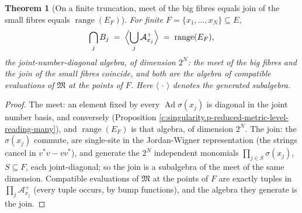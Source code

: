 \documentclass[11pt]{article}
\newtheorem{theorem}{Theorem}[section]
\theoremstyle{definition}
\theoremstyle{plain}
\providecommand{\Aa}{}\renewcommand{\Aa}{\mathcal{A}}
\begin{document}
\begin{theorem}[On a finite truncation, meet of the big fibres equals join of the small fibres equals $\operatorname{range}(E_F)$]\label{c:singularity.finite-truncation-meet-big-fibres-equals}
For finite $F = \{x_1, \dots, x_N\} \subseteq E$,
\[
\bigcap_{j} B_j \;=\; \Bigl\langle \bigcup_j \Aa_{x_j}^{+} \Bigr\rangle \;=\; \operatorname{range}(E_F),
\]
the joint-number-diagonal algebra, of dimension $2^N$: the meet of the big fibres and the join of the small fibres coincide, and both are the algebra of compatible evaluations of $\mathfrak{M}$ at the points of $F$. Here $\langle\,\cdot\,\rangle$ denotes the generated subalgebra.
\end{theorem}
\begin{proof}
The meet: an element fixed by every $\operatorname{Ad}\sigma(x_j)$ is diagonal in the joint number basis, and conversely (Proposition \ref{c:singularity.p-reduced-metric-level-reading-many}), and $\operatorname{range}(E_F)$ is that algebra, of dimension $2^N$. The join: the $\sigma(x_j)$ commute, are single-site in the Jordan-Wigner representation (the strings cancel in $v^{*}v - vv^{*}$), and generate the $2^N$ independent monomials $\prod_{j \in S}\sigma(x_j)$, $S \subseteq F$, each joint-diagonal; so the join is a subalgebra of the meet of the same dimension. Compatible evaluations of $\mathfrak{M}$ at the points of $F$ are exactly tuples in $\prod_j \Aa_{x_j}^{+}$ (every tuple occurs, by bump functions), and the algebra they generate is the join.

\end{proof}
\end{document}

